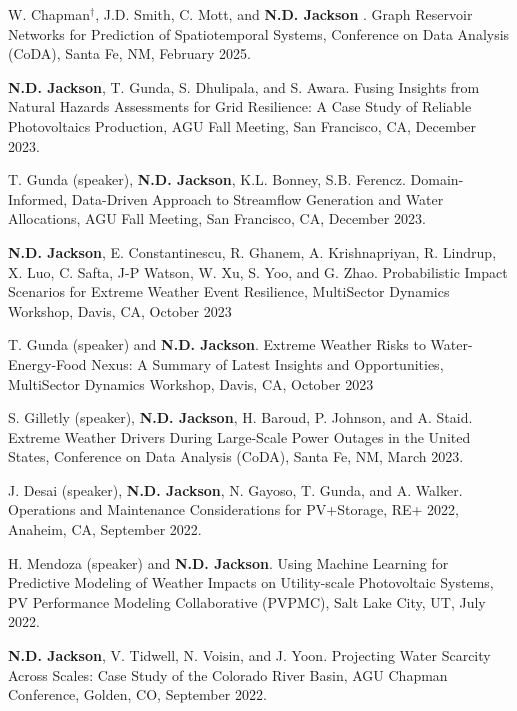 \documentclass{article}[12pt]
\begin{document}
\begin{etaremune}[]
		\item W. Chapman$^{\dagger}$, J.D. Smith, C. Mott,  and \textbf{N.D. Jackson} . Graph Reservoir Networks for Prediction of Spatiotemporal Systems, Conference on Data Analysis (CoDA), Santa Fe, NM, February 2025. 
		
		\item \textbf{N.D. Jackson}, T. Gunda, S. Dhulipala, and S. Awara. Fusing Insights from Natural Hazards Assessments for Grid Resilience: A Case Study of Reliable Photovoltaics Production,  AGU Fall Meeting, San Francisco, CA, December 2023.  
		
		\item T. Gunda (speaker), \textbf{N.D. Jackson}, K.L. Bonney, S.B. Ferencz. Domain-Informed, Data-Driven Approach to Streamflow Generation and Water Allocations, AGU Fall Meeting, San Francisco, CA, December 2023.  
		
		\item \textbf{N.D. Jackson}, E. Constantinescu, R. Ghanem, A. Krishnapriyan, R. Lindrup, X. Luo, C. Safta, J-P Watson, W. Xu, S. Yoo, and G. Zhao. Probabilistic Impact Scenarios for Extreme Weather Event Resilience, MultiSector Dynamics Workshop, Davis, CA, October 2023	
		
		\item T. Gunda (speaker) and \textbf{N.D. Jackson}. Extreme Weather Risks to Water-Energy-Food Nexus: A Summary of Latest Insights and  Opportunities, MultiSector Dynamics Workshop, Davis, CA, October 2023	
		
		\item S. Gilletly (speaker), \textbf{N.D. Jackson}, H. Baroud, P. Johnson, and A. Staid. Extreme Weather Drivers During Large-Scale Power Outages in the United States, Conference on Data Analysis (CoDA), Santa Fe, NM, March 2023.
		
		\item J. Desai (speaker), \textbf{N.D. Jackson}, N. Gayoso, T. Gunda, and A. Walker. Operations and Maintenance Considerations for PV+Storage, RE+ 2022, Anaheim, CA, September 2022.
		
		\item H. Mendoza (speaker) and \textbf{N.D. Jackson}. Using Machine Learning for Predictive Modeling of Weather Impacts on Utility-scale Photovoltaic Systems, PV Performance Modeling Collaborative (PVPMC), Salt Lake City, UT, July 2022. 
		
		\item \textbf{N.D. Jackson}, V. Tidwell, N. Voisin, and J. Yoon. Projecting Water Scarcity Across Scales: Case Study of the Colorado River Basin, AGU Chapman Conference, Golden, CO, September 2022. 
		

\end{etaremune}
\end{document}
